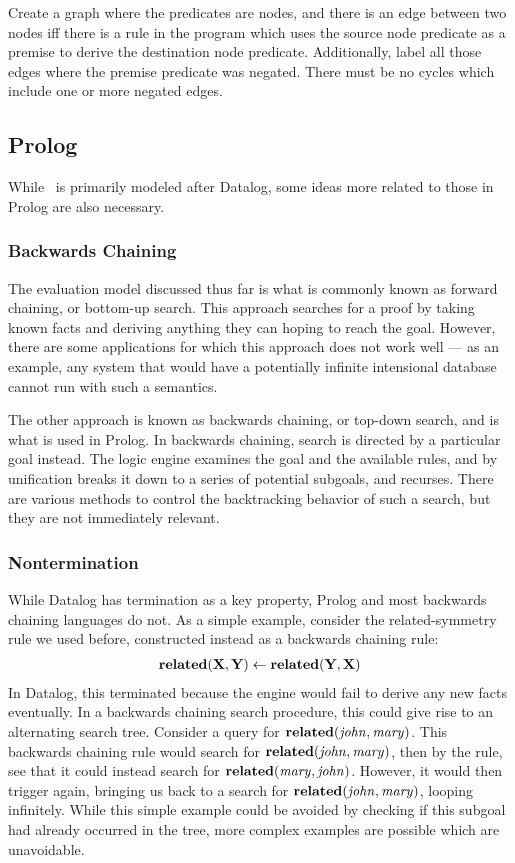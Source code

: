 Create a graph where the predicates are nodes, and there is an edge between two nodes iff there is a rule in the program which uses the source node predicate as a premise to derive the destination node predicate.
Additionally, label all those edges where the premise predicate was negated.
There must be no cycles which include one or more negated edges.

\subsection{Prolog}
While \sysname\ is primarily modeled after Datalog, some ideas more related to those in Prolog are also necessary.
\subsubsection{Backwards Chaining}
\label{sec:backchain}
The evaluation model discussed thus far is what is commonly known as forward chaining, or bottom-up search.
This approach searches for a proof by taking known facts and deriving anything they can hoping to reach the goal.
However, there are some applications for which this approach does not work well --- as an example, any system that would have a potentially infinite intensional database cannot run with such a semantics.

The other approach is known as backwards chaining, or top-down search, and is what is used in Prolog.
In backwards chaining, search is directed by a particular goal instead.
The logic engine examines the goal and the available rules, and by unification breaks it down to a series of potential subgoals, and recurses.
There are various methods to control the backtracking behavior of such a search, but they are not immediately relevant.

\subsubsection{Nontermination}
While Datalog has termination as a key property, Prolog and most backwards chaining languages do not.
As a simple example, consider the related-symmetry rule we used before, constructed instead as a backwards chaining rule:
\begin{gather*}
        {\bf related}({\bf X}, {\bf Y}) \leftarrow {\bf related}({\bf Y}, {\bf X})
\end{gather*}
In Datalog, this terminated because the engine would fail to derive any new facts eventually.
In a backwards chaining search procedure, this could give rise to an alternating search tree.
Consider a query for ${\bf related}({\it john}, {\it mary})$.
This backwards chaining rule would search for ${\bf related}({\it john}, {\it mary})$, then by the rule, see that it could instead search for ${\bf related}({\it mary}, {\it john})$.
However, it would then trigger again, bringing us back to a search for ${\bf related}({\it john}, {\it mary})$, looping infinitely.
While this simple example could be avoided by checking if this subgoal had already occurred in the tree, more complex examples are possible which are unavoidable.

